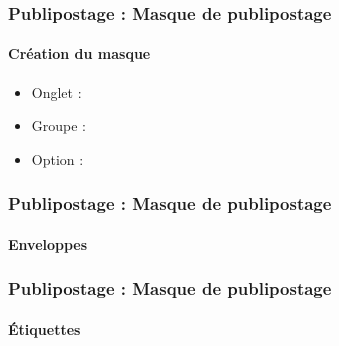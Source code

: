 \documentclass[xcolor=table]{beamer}
\begin{document}
\begin{frame}
\frametitle{Publipostage : Masque de publipostage}
\framesubtitle{Création du masque}

\begin{minipage}{0.53\textwidth}
	\begin{itemize}
		\item Onglet : 
		\item Groupe : 
		\item Option : 
	\end{itemize}
\end{minipage}
\begin{minipage}{0.45\textwidth}
\end{minipage}

\end{frame}

\begin{frame}
\frametitle{Publipostage : Masque de publipostage}
\framesubtitle{Enveloppes}

\begin{minipage}{0.53\textwidth}
\end{minipage}
\begin{minipage}{0.45\textwidth}
\end{minipage}

\end{frame}

\begin{frame}
\frametitle{Publipostage : Masque de publipostage}
\framesubtitle{Étiquettes}

\begin{minipage}{0.63\textwidth}
\end{minipage}
\begin{minipage}{0.36\textwidth}
	
\end{minipage}

\end{frame}
\end{document}
